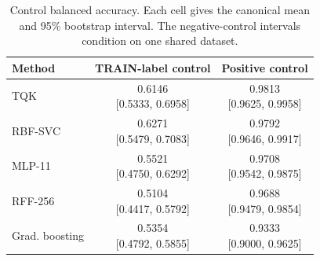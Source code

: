 \begin{table}[t]
\caption{Control balanced accuracy. Each cell gives the canonical mean and 95\% bootstrap interval. The negative-control intervals condition on one shared dataset.}
\label{tab:control-results}
\centering
\footnotesize
\setlength{\tabcolsep}{3pt}
\renewcommand{\arraystretch}{1.15}
\begin{tabular}{lcc}
\toprule
Method & TRAIN-label control & Positive control \\
\midrule
TQK & \shortstack{0.6146\\{}[0.5333, 0.6958]} & \shortstack{0.9813\\{}[0.9625, 0.9958]} \\
RBF-SVC & \shortstack{0.6271\\{}[0.5479, 0.7083]} & \shortstack{0.9792\\{}[0.9646, 0.9917]} \\
MLP-11 & \shortstack{0.5521\\{}[0.4750, 0.6292]} & \shortstack{0.9708\\{}[0.9542, 0.9875]} \\
RFF-256 & \shortstack{0.5104\\{}[0.4417, 0.5792]} & \shortstack{0.9688\\{}[0.9479, 0.9854]} \\
Grad. boosting & \shortstack{0.5354\\{}[0.4792, 0.5855]} & \shortstack{0.9333\\{}[0.9000, 0.9625]} \\
\bottomrule
\end{tabular}
\end{table}
